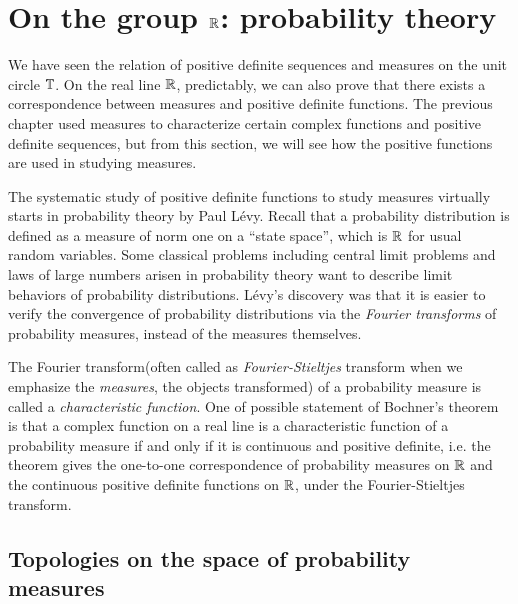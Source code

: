 \documentclass[12pt]{article}
\begin{document}
\begin{ex}

\end{ex}
\begin{ex}

\end{ex}





\newpage
\section{On the group $\mathbb{R}$: probability theory}

We have seen the relation of positive definite sequences and measures on the unit circle $\mathbb{T}$.
On the real line $\mathbb{R}$, predictably, we can also prove that there exists a correspondence between measures and positive definite functions.
The previous chapter used measures to characterize certain complex functions and positive definite sequences, but from this section, we will see how the positive functions are used in studying measures.

The systematic study of positive definite functions to study measures virtually starts in probability theory by Paul L\'evy.
Recall that a probability distribution is defined as a measure of norm one on a ``state space'', which is $\mathbb{R}$ for usual random variables.
Some classical problems including central limit problems and laws of large numbers arisen in probability theory want to describe limit behaviors of probability distributions.
L\'evy's discovery was that it is easier to verify the convergence of probability distributions via the \emph{Fourier transforms} of probability measures, instead of the measures themselves.

The Fourier transform(often called as \emph{Fourier-Stieltjes} transform when we emphasize the \emph{measures}, the objects transformed) of a probability measure is called a \emph{characteristic function}.
One of possible statement of Bochner's theorem is that a complex function on a real line is a characteristic function of a probability measure if and only if it is continuous and positive definite, i.e. the theorem gives the one-to-one correspondence of probability measures on $\mathbb{R}$ and the continuous positive definite functions on $\mathbb{R}$, under the Fourier-Stieltjes transform.



\subsection{Topologies on the space of probability measures}
\end{document}
